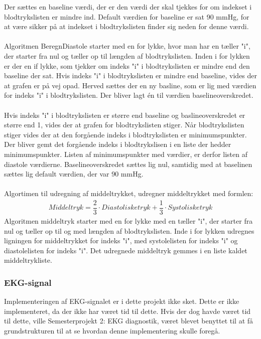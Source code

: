 Der sættes en baseline værdi, der er den værdi der skal tjekkes for om indekset i blodtrykslisten er mindre ind. Default værdien for baseline er sat 90 mmHg, for at være sikker på at indekset i blodtrykslisten finder sig neden for denne værdi.\\\\
 Algoritmen BeregnDiastole starter med en for lykke, hvor man har en tæller "i", der starter fra nul og tæller op til længden af blodtrykslisten. Inden i for lykken er der en if lykke, som tjekker om indeks "i" i blodtrykslisten er mindre end den baseline der sat. Hvis indeks "i" i blodtrykslisten er mindre end baseline, vides der at grafen er på vej opad. Herved sættes der en ny basline, som er lig med værdien for indeks "i" i blodtrykslisten.  Der bliver lagt én til værdien baselineoverskredet. \\\\
Hvis indeks "i" i blodtrykslisten er større end baseline og baslineoverskredet er større end 1, vides der at grafen for blodtrykslisten stiger. Når blodtrykslisten stiger vides der at den forgående indeks i blodtrykslisten er minimumspunkter. Der bliver gemt det forgående indeks i blodtrykslisen i en liste der hedder minimumspunkter. Listen af minimumspunkter med værdier, er derfor listen af diastole værdierne. Baselineoverskredet sættes lig nul, samtidig med at baselinen sættes lig default værdien, der var 90 mmHg.\\\\
Algortimen til udregning af middeltrykket, udregner middeltrykket med \cite{blodtrykwiki} formlen:
\begin{align}
Middeltryk = \dfrac{2}{3}\cdot Diastoliske tryk + \dfrac{1}{3} \cdot Systoliske tryk
\end{align}
Algoritmen middeltryk starter med en for lykke med en tæller "i", der starter fra nul og tæller op til og med længden af blodtrykslisten. Inde i for lykken udregnes ligningen for middeltrykket for indeks "i", med systolelisten for indeks "i" og diastolelisten for indeks "i". Det udregnede middeltryk gemmes i en liste kaldet middeltrykliste. 
\subsubsection{EKG-signal}
Implementeringen af EKG-signalet er i dette projekt ikke sket. Dette er ikke implementeret, da der ikke har været tid til dette. Hvis der dog havde været tid til dette, ville Semesterprojekt 2: EKG diagnostik, været blevet benyttet til at få grundstrukturen til at se hvordan denne implementering skulle foregå.
